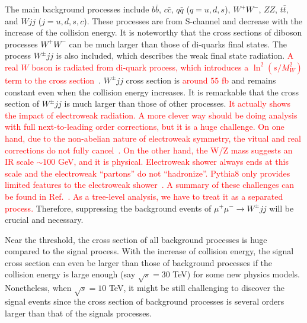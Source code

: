 \documentclass[a4paper,11pt]{article}
\begin{document}
The main background processes include $b\bar{b}$, $c\bar{c}$, $q\bar{q}$ ($q=u,d,s$), $W^+ W^-$, $ZZ$, $t \bar{t}$, and $Wjj$ ($j=u,d,s,c$). 
These processes are from S-channel and decrease with the increase of the collision energy. 
It is noteworthy that the cross sections of diboson processes $W^+W^-$ can be much larger than those of di-quarks final states. 
The process $W^\pm jj$ is also included, which describes the weak final state radiation. 
\textcolor{red}{A real $W$ boson is radiated from di-quark process, which introduces a $\ln^2(s/M^2_{W})$ term to the cross section~\cite{Bell:2010gi}}.  
$W^\pm jj$ cross section is \textcolor{red}{around $55$ fb} and remains constant even when the collision energy increases. 
It is remarkable that the cross section of $W^\pm jj$ is much larger than those of other processes. 
\textcolor{red}{It actually shows the impact of electroweak radiation. 
A more clever way should be doing analysis with full next-to-leading order corrections, 
but it is a huge challenge. 
On one hand, 
due to the non-abelian nature of electroweak symmetry, the vitual and real corrections do not fully cancel~\cite{Ciafaloni:2000df,Ciafaloni:2000rp}.
On the other hand, 
the W/Z mass suggests an IR scale $\sim 100$ GeV, and it is physical. 
Electroweak shower always ends at this scale and the electroweak ``partons'' do not ``hadronize''. 
Pythia8 only provides limited features to the electroweak shower~\cite{Christiansen:2014kba,Christiansen:2015jpa}. 
A summary of these challenges can be found in Ref.~\cite{Accettura:2023ked}.
As a tree-level analysis, we have to treat it as a separated process.}
Therefore, suppressing the background events of $\mu^+ \mu^- \to W^\pm jj$ will be crucial and necessary.

Near the threshold, the cross section of all background processes is huge compared to the signal process. 
With the increase of collision energy, 
the signal cross section can even be larger than those of background processes if the collision energy is large enough (say $\sqrt{s}=30$ TeV) for some new physics models. 
Nonetheless, when $\sqrt{s}=10$ TeV, it might be still challenging to discover the signal events since the cross section of background processes is several orders larger than that of the signals processes.
\end{document}
